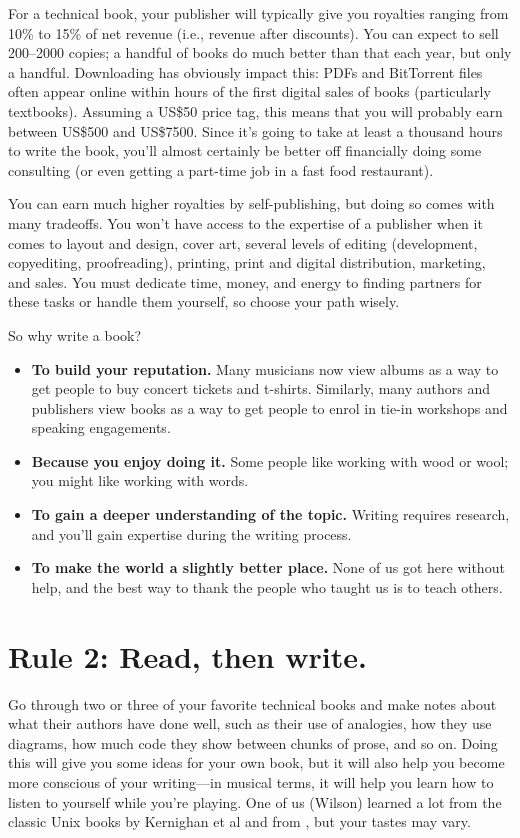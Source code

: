 \documentclass[10pt,letterpaper]{article}
\begin{document}
For a technical book, your publisher will typically give you royalties
ranging from 10\% to 15\% of net revenue (i.e., revenue after
discounts). You can expect to sell 200--2000 copies; a handful of books
do much better than that each year, but only a handful. Downloading has
obviously impact this: PDFs and BitTorrent files often appear online
within hours of the first digital sales of books (particularly
textbooks). Assuming a US\$50 price tag, this means that you will
probably earn between US\$500 and US\$7500. Since it's going to take at
least a thousand hours to write the book, you'll almost certainly be
better off financially doing some consulting (or even getting a
part-time job in a fast food restaurant).

You can earn much higher royalties by self-publishing, but doing so
comes with many tradeoffs. You won't have access to the expertise of a
publisher when it comes to layout and design, cover art, several levels
of editing (development, copyediting, proofreading), printing, print and
digital distribution, marketing, and sales. You must dedicate time,
money, and energy to finding partners for these tasks or handle them
yourself, so choose your path wisely.

So why write a book?

\begin{itemize}
\item
  \textbf{To build your reputation.} Many musicians now view albums as a
  way to get people to buy concert tickets and t-shirts. Similarly, many
  authors and publishers view books as a way to get people to enrol in
  tie-in workshops and speaking engagements.
\item
  \textbf{Because you enjoy doing it.} Some people like working with
  wood or wool; you might like working with words.
\item
  \textbf{To gain a deeper understanding of the topic.} Writing requires
  research, and you'll gain expertise during the writing process.
\item
  \textbf{To make the world a slightly better place.} None of us got
  here without help, and the best way to thank the people who taught us
  is to teach others.
\end{itemize}

\section*{Rule 2: Read, then write.}

Go through two or three of your favorite technical books and make
notes about what their authors have done well, such as their use of
analogies, how they use diagrams, how much code they show between
chunks of prose, and so on. Doing this will give you some ideas for
your own book, but it will also help you become more conscious of your
writing---in musical terms, it will help you learn how to listen to
yourself while you're playing. One of us (Wilson) learned a lot from
the classic Unix books by Kernighan et
al \cite{Ke1979,Ke1981,Ke1983,Ke1988} and from \cite{Ud1999}, but your
tastes may vary.
\end{document}
